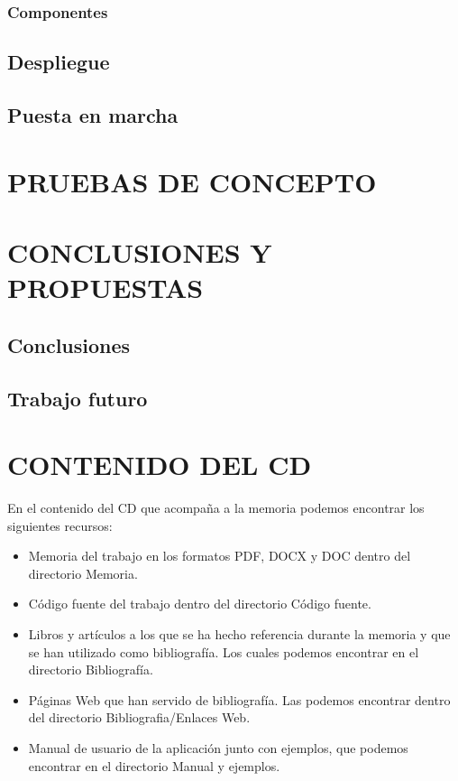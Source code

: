\documentclass[spanish,twoside,12pt,a4paper]{book}
\begin{document}
\subsection{Componentes}

\section{Despliegue}

\section{Puesta en marcha}

\chapter{PRUEBAS DE CONCEPTO}

\chapter{CONCLUSIONES Y PROPUESTAS}


\section{Conclusiones}



\section{Trabajo futuro}

\nocite{*}




%
%


\chapter*{CONTENIDO DEL CD}
En el contenido del CD que acompaña a la memoria podemos encontrar los
siguientes recursos:
\begin{itemize}
 \item Memoria del trabajo en los formatos PDF, DOCX y DOC dentro del directorio
Memoria.
 \item Código fuente del trabajo dentro del directorio Código fuente.
 \item Libros y artículos a los que se ha hecho referencia durante la memoria y que se han
utilizado como bibliografía. Los cuales podemos encontrar en el directorio
Bibliografía.
 \item Páginas Web que han servido de bibliografía. Las podemos encontrar dentro del
directorio Bibliografia/Enlaces Web.
 \item Manual de usuario de la aplicación junto con ejemplos, que podemos encontrar en
el directorio Manual y ejemplos.
\end{itemize}
\end{document}
